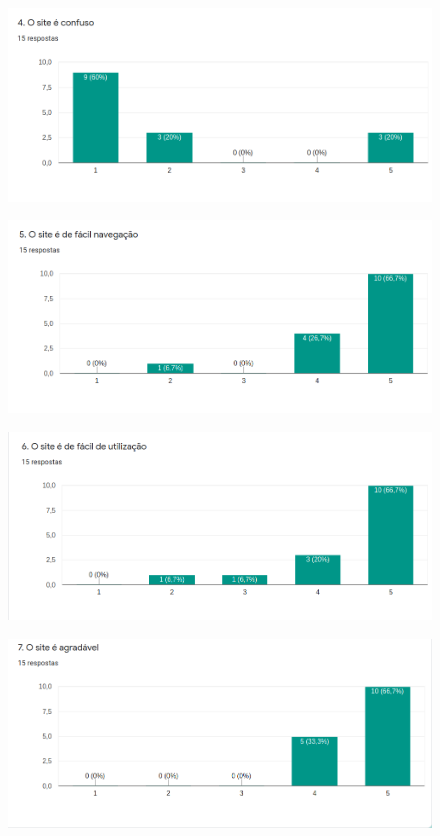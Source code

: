 \begin{apendicesenv}
\begin{figure}[h]
	\centering
	\includegraphics[keepaspectratio=true,scale=0.9]{figuras/4.png}
\end{figure}

\begin{figure}[h]
	\centering
	\includegraphics[keepaspectratio=true,scale=0.9]{figuras/5.png}
\end{figure}

\begin{figure}[h]
	\centering
	\includegraphics[keepaspectratio=true,scale=0.9]{figuras/6.png}
\end{figure}

\begin{figure}[h]
	\centering
	\includegraphics[keepaspectratio=true,scale=0.9]{figuras/7.png}
\end{figure}


\end{apendicesenv}
